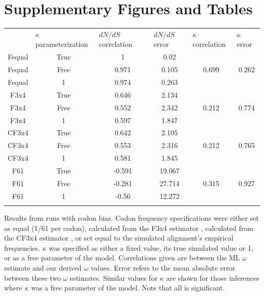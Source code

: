 \documentclass[11pt]{article}
\makeatletter
\newcommand{\customlabel}[2]{%
\protected@write \@auxout {}{\string \newlabel {#1}{{#2}{\thepage}{}{}{}}}}
\makeatother
\begin{document}
\clearpage
\newpage

\section*{Supplementary Figures and Tables}

\begin{table}[htbp]
\customlabel{tab:tabS1}{tabS1}
\begin{tabular}{c c c c c c}
\hline\noalign{\smallskip}
\multicolumn{1}{l}{Codon frequencies} & \multicolumn{1}{l}{$\kappa$ parameterization} & \multicolumn{1}{l}{$dN/dS$ correlation} &\multicolumn{1}{l}{$dN/dS$ error} & \multicolumn{1}{l}{$\kappa$ correlation} &\multicolumn{1}{l}{$\kappa$ error} \\
\noalign{\smallskip}\hline\noalign{\smallskip}
Fequal & True & 1 & 0.02 &   &   \\ 
Fequal & Free & 0.971 & 0.105 & 0.699 & 0.262 \\ 
Fequal & 1 & 0.974 & 0.263 &   &   \\ 
\hline\noalign{\smallskip}
F3x4 & True & 0.646 & 2.134 &   &   \\ 
F3x4 & Free & 0.552 & 2.342 & 0.212 & 0.774 \\ 
F3x4 & 1 & 0.597 & 1.847 &   &   \\ 
\hline\noalign{\smallskip}
CF3x4 & True & 0.642 & 2.105 &   &   \\ 
CF3x4 & Free & 0.553 & 2.316 & 0.212 & 0.765 \\ 
CF3x4 & 1 & 0.581 & 1.845 &   &   \\ 
\hline\noalign{\smallskip}
F61 & True & -0.591 & 19.067 &   &   \\ 
F61 & Free & -0.281 & 27.714 & 0.315 & 0.927 \\ 
F61 & 1 & -0.56 & 12.272 &   &   \\ 
\noalign{\smallskip}\hline\noalign{\smallskip}
\end{tabular}
\newline
Results from runs with codon bias. Codon frequency specifications were either set as equal (1/61 per codon), calculated from the F3x4 estimator \cite{MuseGaut1994}, calculated from the CF3x4 estimator \cite{Pond2010}, or set equal to the simulated alignment's empirical frequencies. $\kappa$ was specified as either a fixed value, its true simulated value or 1, or as a free parameter of the model. Correlations given are between the ML $\omega$ estimate and our derived $\omega$ values. Error refers to the mean absolute error between these two $\omega$ estimates. Similar values for $\kappa$ are shown for those inferences where $\kappa$ was a free parameter of the model. Note that all is significant.
\end{table}	
\end{document}
